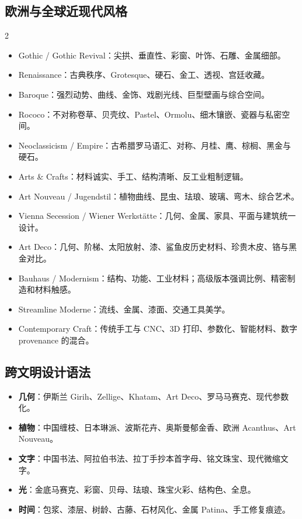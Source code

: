 \documentclass[lang=en,a4paper,11pt]{elegantpaper}
\begin{document}
\subsection{欧洲与全球近现代风格}
\begin{multicols}{2}\begin{itemize}
\item Gothic / Gothic Revival：尖拱、垂直性、彩窗、叶饰、石雕、金属细部。
\item Renaissance：古典秩序、Grotesque、硬石、金工、透视、宫廷收藏。
\item Baroque：强烈动势、曲线、金饰、戏剧光线、巨型壁画与综合空间。
\item Rococo：不对称卷草、贝壳纹、Pastel、Ormolu、细木镶嵌、瓷器与私密空间。
\item Neoclassicism / Empire：古希腊罗马语汇、对称、月桂、鹰、棕榈、黑金与硬石。
\item Arts \& Crafts：材料诚实、手工、结构清晰、反工业粗制逻辑。
\item Art Nouveau / Jugendstil：植物曲线、昆虫、珐琅、玻璃、弯木、综合艺术。
\item Vienna Secession / Wiener Werkstätte：几何、金属、家具、平面与建筑统一设计。
\item Art Deco：几何、阶梯、太阳放射、漆、鲨鱼皮历史材料、珍贵木皮、铬与黑金对比。
\item Bauhaus / Modernism：结构、功能、工业材料；高级版本强调比例、精密制造和材料触感。
\item Streamline Moderne：流线、金属、漆面、交通工具美学。
\item Contemporary Craft：传统手工与 CNC、3D 打印、参数化、智能材料、数字 provenance 的混合。
\end{itemize}\end{multicols}
\subsection{跨文明设计语法}
\begin{itemize}
\item \textbf{几何}：伊斯兰 Girih、Zellige、Khatam、Art Deco、罗马马赛克、现代参数化。
\item \textbf{植物}：中国缠枝、日本琳派、波斯花卉、奥斯曼郁金香、欧洲 Acanthus、Art Nouveau。
\item \textbf{文字}：中国书法、阿拉伯书法、拉丁手抄本首字母、铭文珠宝、现代微缩文字。
\item \textbf{光}：金底马赛克、彩窗、贝母、珐琅、珠宝火彩、结构色、全息。
\item \textbf{时间}：包浆、漆层、树龄、古藤、石材风化、金属 Patina、手工修复痕迹。
\end{itemize}
\end{document}

